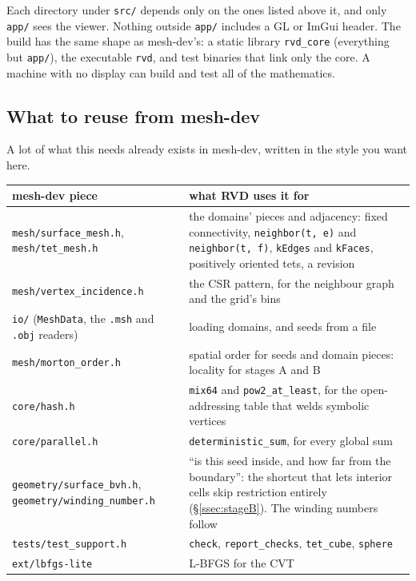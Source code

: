 \documentclass[11pt,a4paper]{article}
\newcommand{\code}[1]{\texttt{#1}}          %
\newcommand{\secref}[1]{\S\ref{#1}}
\begin{document}
Each directory under \code{src/} depends only on the ones listed above it, and only
\code{app/} sees the viewer. Nothing outside \code{app/} includes a GL or ImGui header. The build
has the same shape as mesh-dev's: a static library \code{rvd\_core} (everything but
\code{app/}), the executable \code{rvd}, and test binaries that link only the core. A machine
with no display can build and test all of the mathematics.

\subsection{What to reuse from mesh-dev}\label{ssec:reuse}

A lot of what this needs already exists in mesh-dev, written in the style you want here.

{\small
\begin{xltabular}{\linewidth}{@{}P{5.2cm} L@{}}
\toprule
mesh-dev piece & what RVD uses it for \\
\midrule
\endhead
\code{mesh/surface\_mesh.h}, \code{mesh/tet\_mesh.h}
  & the domains' pieces and adjacency: fixed connectivity, \code{neighbor(t, e)} and
    \code{neighbor(t, f)}, \code{kEdges} and \code{kFaces}, positively oriented tets, a
    revision \\
\code{mesh/vertex\_incidence.h}
  & the CSR pattern, for the neighbour graph and the grid's bins \\
\code{io/} (\code{MeshData}, the \code{.msh} and \code{.obj} readers)
  & loading domains, and seeds from a file \\
\code{mesh/morton\_order.h}
  & spatial order for seeds and domain pieces: locality for stages A and B \\
\code{core/hash.h}
  & \code{mix64} and \code{pow2\_at\_least}, for the open-addressing table that welds symbolic
    vertices \\
\code{core/parallel.h}
  & \code{deterministic\_sum}, for every global sum \\
\code{geometry/surface\_bvh.h}, \code{geometry/winding\_number.h}
  & ``is this seed inside, and how far from the boundary'': the shortcut that lets interior
    cells skip restriction entirely (\secref{ssec:stageB}). The winding numbers follow
    \citet{barill2018} \\
\code{tests/test\_support.h}
  & \code{check}, \code{report\_checks}, \code{tet\_cube}, \code{sphere} \\
\code{ext/lbfgs-lite}
  & L-BFGS for the CVT \\
\bottomrule
\end{xltabular}}
\end{document}
